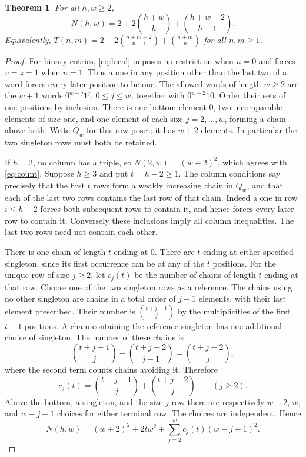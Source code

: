 \documentclass[11pt]{article}
\newtheorem{theorem}{Theorem}
\newcommand{\bin}[2]{\binom{#1}{#2}}
\begin{document}
\begin{theorem}\label{thm:table}
For all $h,w\ge2$,
\begin{equation}\label{eq:count}
             N(h,w)=2+2\bin{h+w}{h}+\bin{h+w-2}{h-1}.
\end{equation}
Equivalently, $T(n,m)=2+2\bin{n+m+2}{n+1}+\bin{n+m}{n}$ for all $n,m\ge1$.
\end{theorem}
\begin{proof}
For binary entries, \eqref{eq:local} imposes no restriction when $u=0$ and forces $v=z=1$ when $u=1$. Thus a one in any position other than the last two of a word forces every later position to be one. The allowed words of length $w\ge2$ are the $w+1$ words
$0^{w-j}1^j$, $0\le j\le w$, together with $0^{w-2}10$.
Order their sets of one-positions by inclusion. There is one bottom element $0$, two incomparable elements of size one, and one element of each size $j=2,\ldots,w$, forming a chain above both. Write $Q_w$ for this row poset; it has $w+2$ elements. In particular the two singleton rows must both be retained.

If $h=2$, no column has a triple, so $N(2,w)=(w+2)^2$, which agrees with \eqref{eq:count}. Suppose $h\ge3$ and put $t=h-2\ge1$. The column conditions say precisely that the first $t$ rows form a weakly increasing chain in $Q_w$, and that each of the last two rows contains the last row of that chain. Indeed a one in row $i\le h-2$ forces both subsequent rows to contain it, and hence forces every later row to contain it. Conversely these inclusions imply all column inequalities. The last two rows need not contain each other.

There is one chain of length $t$ ending at $0$. There are $t$ ending at either specified singleton, since its first occurrence can be at any of the $t$ positions. For the unique row of size $j\ge2$, let $c_j(t)$ be the number of chains of length $t$ ending at that row. Choose one of the two singleton rows as a reference. The chains using no other singleton are chains in a total order of $j+1$ elements, with their last element prescribed. Their number is $\bin{t+j-1}{j}$ by the multiplicities of the first $t-1$ positions. A chain containing the reference singleton has one additional choice of singleton. The number of these chains is
\[
 \bin{t+j-1}{j}-\bin{t+j-2}{j-1}=\bin{t+j-2}{j},
\]
where the second term counts chains avoiding it. Therefore
\begin{equation}\label{eq:chains}
 c_j(t)=\bin{t+j-1}{j}+\bin{t+j-2}{j}\qquad(j\ge2).
\end{equation}
Above the bottom, a singleton, and the size-$j$ row there are respectively $w+2$, $w$, and $w-j+1$ choices for either terminal row. The choices are independent. Hence
\begin{equation}\label{eq:sum}
 N(h,w)=(w+2)^2+2tw^2+
        \sum_{j=2}^w c_j(t)(w-j+1)^2.
\end{equation}


\end{proof}
\end{document}
